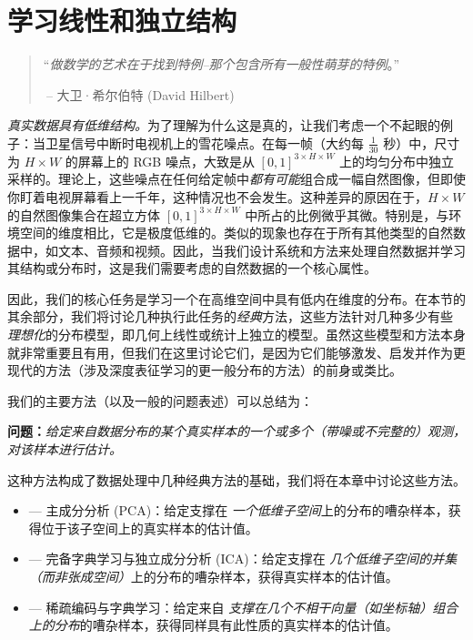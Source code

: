 \documentclass[../../book-main_zh.tex]{subfiles}
\begin{document}
\chapter{学习线性和独立结构}
\label{ch:classic-models}

\begin{quote}
    \hfill  ``{\em 做数学的艺术在于找到特例--那个包含所有一般性萌芽的特例}。''

    $~$\hfill -- 大卫·希尔伯特 (David Hilbert)
\end{quote}
\vspace{5mm}

\textit{真实数据具有低维结构。}为了理解为什么这是真的，让我们考虑一个不起眼的例子：当卫星信号中断时电视机上的雪花噪点。在每一帧（大约每
\(\frac{1}{30}\) 秒）中，尺寸为 \(H \times W\) 的屏幕上的 RGB 噪点，大致是从 \([0, 1]^{3
\times H \times W}\)
上的均匀分布中独立采样的。理论上，这些噪点在任何给定帧中\textit{都有可能}组合成一幅自然图像，但即使你盯着电视屏幕看上一千年，这种情况也不会发生。这种差异的原因在于，\(H
\times W\) 的自然图像集合在超立方体 \([0, 1]^{3 \times H \times W}\)
中所占的比例微乎其微。特别是，与环境空间的维度相比，它是极度低维的。类似的现象也存在于所有其他类型的自然数据中，如文本、音频和视频。因此，当我们设计系统和方法来处理自然数据并学习其结构或分布时，这是我们需要考虑的自然数据的一个核心属性。
%

因此，我们的核心任务是学习一个在高维空间中具有低内在维度的分布。在本节的其余部分，我们将讨论几种执行此任务的\textit{经典}方法，这些方法针对几种多少有些{\em
理想化}的分布模型，即几何上线性或统计上独立的模型。虽然这些模型和方法本身就非常重要且有用，但我们在这里讨论它们，是因为它们能够激发、启发并作为更现代的方法（涉及深度表征学习的更一般分布的方法）的前身或类比。

我们的主要方法（以及一般的问题表述）可以总结为：
\begin{tcolorbox}\centering
    \textbf{问题：}\textit{给定来自数据分布的某个真实样本的一个或多个（带噪或不完整的）观测，对该样本进行估计。}
\end{tcolorbox}
这种方法构成了数据处理中几种经典方法的基础，我们将在本章中讨论这些方法。
\begin{itemize}
    \item {} --- 主成分分析 (PCA)：给定支撑在{\em
        一个低维子空间}上的分布的嘈杂样本，获得位于该子空间上的真实样本的估计值。
    \item  {} --- 完备字典学习与独立成分分析 (ICA)：给定支撑在{\em
        几个低维子空间的并集（\textit{而非}张成空间）}上的分布的嘈杂样本，获得真实样本的估计值。
    \item {} --- 稀疏编码与字典学习：给定来自{\em
        支撑在几个不相干向量（如坐标轴）组合上的分布}的嘈杂样本，获得同样具有此性质的真实样本的估计值。
\end{itemize}
\end{document}
